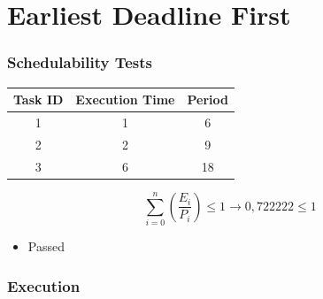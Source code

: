 \documentclass[xcolor=table]{beamer}
\begin{document}
\section{Earliest Deadline First}
\begin{frame}
\frametitle{Schedulability Tests}
\begin{table}[]
\begin{tabular}{|c|c|c|}
\hline
\textbf{Task ID} & \textbf{Execution Time} & \textbf{Period}\\ \hline
\cellcolor[HTML]{ECF6CE}1 &\cellcolor[HTML]{ECF6CE}1 &\cellcolor[HTML]{ECF6CE}6 \\ \hline
\cellcolor[HTML]{A4A4A4}2 &\cellcolor[HTML]{A4A4A4}2 &\cellcolor[HTML]{A4A4A4}9 \\ \hline
\cellcolor[HTML]{F781D8}3 &\cellcolor[HTML]{F781D8}6 &\cellcolor[HTML]{F781D8}18 \\ \hline
\end{tabular}
\end{table}
\begin{equation}
\sum_{i=0}^{n} \left( \frac{E_i}{P_i} \right) \leq 1 \rightarrow0,722222 \leq 1
\end{equation}
\begin{itemize}
\item Passed\end{itemize}
\end{frame}
\begin{frame}
\frametitle{Execution}
\begin{table}[]
\end{table}
\end{frame}
\end{document}
